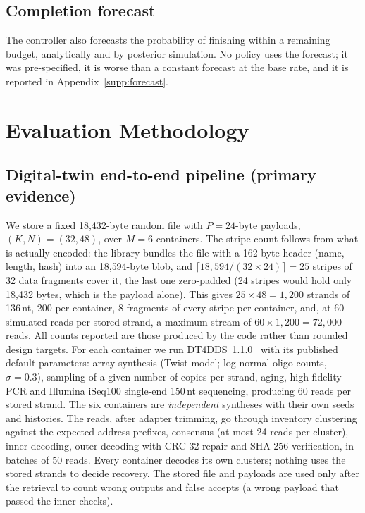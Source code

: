 \documentclass[acmsmall,screen]{acmart}
\begin{document}
\subsection{Completion forecast}
The controller also forecasts the probability of finishing within a remaining budget, analytically and by
posterior simulation.  No policy uses the forecast; it was pre-specified, it is worse than a constant
forecast at the base rate, and it is reported in Appendix~\ref{supp:forecast}.

\section{Evaluation Methodology}\label{sec:eval}
\subsection{Digital-twin end-to-end pipeline (primary evidence)}
We store a fixed 18{,}432-byte random file with $P{=}24$-byte payloads, $(K,N)=(32,48)$, over
$M{=}6$ containers.  The stripe count follows from what is actually encoded: the library bundles the
file with a 162-byte header (name, length, hash) into an 18{,}594-byte blob, and
$\lceil 18{,}594/(32\times24)\rceil=25$ stripes of 32 data fragments cover it, the last one
zero-padded (24 stripes would hold only 18{,}432 bytes, which is the payload alone).  This gives
$25\times48=1{,}200$ strands of 136\,nt, 200 per container, 8 fragments of every stripe per container,
and, at 60 simulated reads per stored strand, a maximum stream of $60\times1{,}200=72{,}000$ reads.
All counts reported are those produced by the code rather than rounded design targets.  For each
container we run
DT4DDS~1.1.0~\cite{gimpel2023digital} with its published default parameters: array synthesis
(Twist model; log-normal oligo counts, $\sigma{=}0.3$), sampling of a given number of copies
per strand, aging, high-fidelity PCR and Illumina iSeq100 single-end 150\,nt sequencing,
producing 60 reads per stored strand.  The six containers are \emph{independent} syntheses with
their own seeds and histories.  The reads, after adapter trimming, go through inventory
clustering against the expected address prefixes, consensus (at most 24 reads per cluster),
inner decoding, outer decoding with CRC-32 repair and SHA-256 verification, in batches of 50
reads.  Every container decodes its own clusters; nothing uses the stored strands to decide
recovery.  The stored file and payloads are used only after the retrieval to count wrong
outputs and false accepts (a wrong payload that passed the inner checks).
\end{document}
